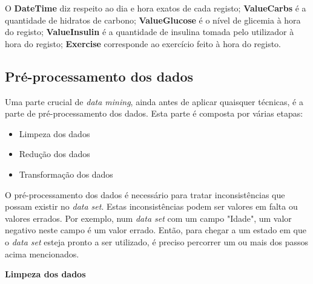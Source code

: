 O \textbf{DateTime} diz respeito ao dia e hora exatos de cada registo;
\textbf{Value\textunderscore Carbs} é a quantidade de hidratos de carbono;
\textbf{Value\textunderscore Glucose} é o nível de glicemia à hora do registo;
\textbf{Value\textunderscore Insulin} é a quantidade de insulina tomada pelo utilizador à hora do registo;
\textbf{Exercise} corresponde ao exercício feito à hora do registo.

\subsection{Pré-processamento dos dados}

Uma parte crucial de \textit{data mining}, ainda antes de aplicar quaisquer técnicas, é a parte de pré-processamento dos dados. Esta parte é composta por várias etapas:

\begin{itemize}
\item Limpeza dos dados
\item Redução dos dados
\item Transformação dos dados
\end{itemize}
 
O pré-processamento dos dados é necessário para tratar inconsistências que possam existir no \textit{data set}. Estas inconsistências podem ser valores em falta ou valores errados. Por exemplo, num \textit{data set} com um campo "Idade", um valor negativo neste campo é um valor errado. Então, para chegar a um estado em que o \textit{data set} esteja pronto a ser utilizado, é preciso percorrer um ou mais dos passos acima mencionados. 

\textbf{Limpeza dos dados} 